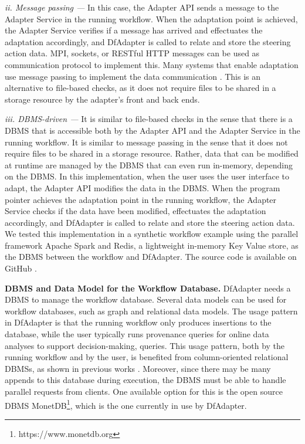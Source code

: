 \emph{ii. Message passing ---} In this case, the Adapter API sends a message to the Adapter Service in the
running workflow. When the adaptation point is achieved, the Adapter Service verifies if a message has arrived and effectuates the
adaptation accordingly, and DfAdapter is called to relate and store the
steering action data.
MPI, sockets, or RESTful HTTP messages can be used as
communication protocol to implement this.
Many systems that enable adaptation use message passing to implement the data communication
\cite{Pickles2005practical,Figueira2004CS_LITE:,Knezevic2011Interactive}.
This is an alternative to file-based checks, as it does not require
files to be shared in a storage resource by the adapter's front and back
ends.

\emph{iii. DBMS-driven ---}
It is similar to file-based checks in the sense that
there is a DBMS that is accessible both by the Adapter API and the Adapter Service in the running workflow.
It is similar to message passing in the sense that it does
not require files to be shared in a storage resource.
Rather, data that
can be modified at runtime are managed by the DBMS that can even run
in-memory, depending on the DBMS.
In this implementation, when the user uses the user interface to adapt, the Adapter API modifies the data in the DBMS.
When the program pointer achieves the adaptation point in the running
workflow, the Adapter Service checks if the data have been modified, effectuates
the adaptation accordingly, and DfAdapter is called to relate and store the steering action data.
We tested this implementation in a synthetic workflow example using the parallel framework
Apache Spark and Redis, a lightweight in-memory Key Value store, as the
DBMS between the workflow and DfAdapter. The source code is available on
GitHub \cite{DfAdapterGitHubDfAdapter}.

\textbf{DBMS and Data Model for the Workflow Database.} DfAdapter
needs a DBMS to manage the workflow database. Several data models can
be used for workflow databases, such as graph and relational data
models. The usage pattern in DfAdapter is that the running workflow only
produces insertions to the database, while the user typically
runs provenance queries for online data analyses to support
decision-making, \ie{}  queries.
This usage pattern, both by
the running workflow and by the user, is benefited from column-oriented
relational DBMSs, as shown in previous works
\cite{Silva2017Raw,Camata2018In}.
Moreover, since there may be many appends to this database during
execution, the DBMS must be able to handle parallel requests from
clients. One available option for this is the open source DBMS MonetDB\footnote{https://www.monetdb.org}, which is the one currently in use by DfAdapter.

